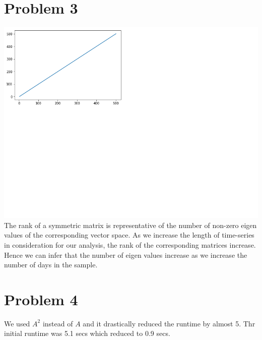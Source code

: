 \documentclass[twoside,11pt]{article}
\let\oldsection\section
\renewcommand\section{\clearpage\oldsection}
\begin{document}
\section*{Problem 3}
\includegraphics{graph_q3.png}
The rank of a symmetric matrix is representative of the number of non-zero eigen values of the corresponding vector space. As we increase the length of time-series in consideration for our analysis, the rank of the corresponding matrices increase. Hence we can infer that the number of eigen values increase as we increase the number of days in the sample.
\section*{Problem 4}
We used	$A^2$ instead of $A$ and it drastically reduced the runtime by almost 5. Thr initial runtime was 5.1 secs which reduced to 0.9 secs.
\end{document}
